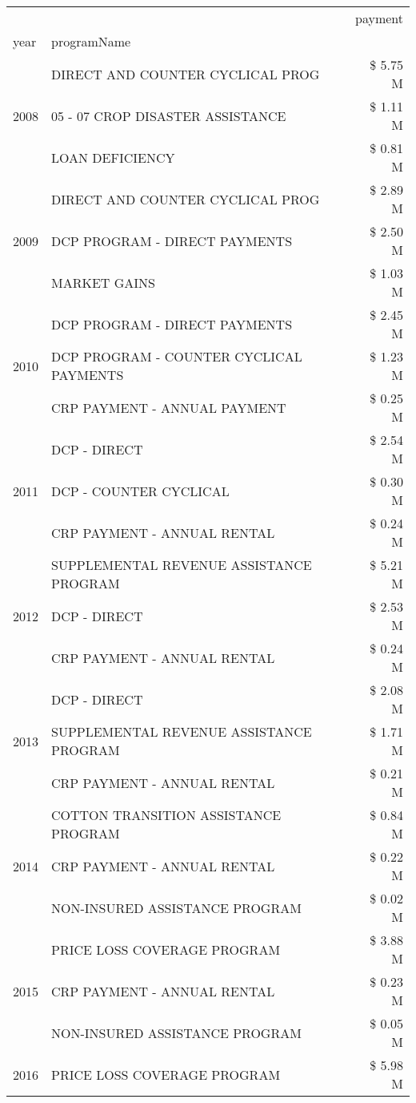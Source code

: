 \begin{tabular}{llr}
\toprule
 &  & payment \\
year & programName &  \\
\midrule
\multirow[t]{3}{*}{2008} & DIRECT AND COUNTER CYCLICAL PROG & \$ 5.75 M \\
 & 05 - 07 CROP DISASTER ASSISTANCE & \$ 1.11 M \\
 & LOAN DEFICIENCY & \$ 0.81 M \\
\cline{1-3}
\multirow[t]{3}{*}{2009} & DIRECT AND COUNTER CYCLICAL PROG & \$ 2.89 M \\
 & DCP PROGRAM - DIRECT PAYMENTS & \$ 2.50 M \\
 & MARKET GAINS & \$ 1.03 M \\
\cline{1-3}
\multirow[t]{3}{*}{2010} & DCP PROGRAM - DIRECT PAYMENTS & \$ 2.45 M \\
 & DCP PROGRAM - COUNTER CYCLICAL PAYMENTS & \$ 1.23 M \\
 & CRP PAYMENT - ANNUAL PAYMENT & \$ 0.25 M \\
\cline{1-3}
\multirow[t]{3}{*}{2011} & DCP - DIRECT & \$ 2.54 M \\
 & DCP - COUNTER CYCLICAL & \$ 0.30 M \\
 & CRP PAYMENT - ANNUAL RENTAL & \$ 0.24 M \\
\cline{1-3}
\multirow[t]{3}{*}{2012} & SUPPLEMENTAL REVENUE ASSISTANCE PROGRAM & \$ 5.21 M \\
 & DCP - DIRECT & \$ 2.53 M \\
 & CRP PAYMENT - ANNUAL RENTAL & \$ 0.24 M \\
\cline{1-3}
\multirow[t]{3}{*}{2013} & DCP - DIRECT & \$ 2.08 M \\
 & SUPPLEMENTAL REVENUE ASSISTANCE PROGRAM & \$ 1.71 M \\
 & CRP PAYMENT - ANNUAL RENTAL & \$ 0.21 M \\
\cline{1-3}
\multirow[t]{3}{*}{2014} & COTTON TRANSITION ASSISTANCE PROGRAM & \$ 0.84 M \\
 & CRP PAYMENT - ANNUAL RENTAL & \$ 0.22 M \\
 & NON-INSURED ASSISTANCE PROGRAM & \$ 0.02 M \\
\cline{1-3}
\multirow[t]{3}{*}{2015} & PRICE LOSS COVERAGE PROGRAM & \$ 3.88 M \\
 & CRP PAYMENT - ANNUAL RENTAL & \$ 0.23 M \\
 & NON-INSURED ASSISTANCE PROGRAM & \$ 0.05 M \\
\cline{1-3}
\multirow[t]{3}{*}{2016} & PRICE LOSS COVERAGE PROGRAM & \$ 5.98 M \\

\end{tabular}
